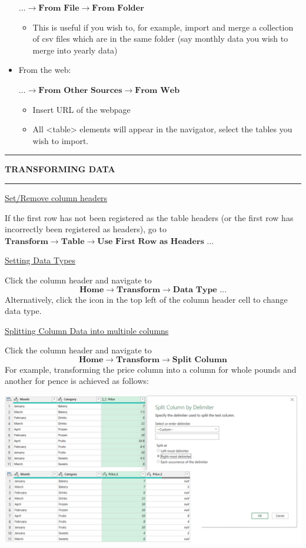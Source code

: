 \documentclass[8pt]{extarticle}
\newcommand{\heading}[1]{%
    \noindent
    \rule{\linewidth}{0.4pt}
    \begin{center}
        \vspace{-1ex}
        \textbf{#1}        
        \vspace{-2.5ex}
    \end{center}
    \rule{\linewidth}{0.4pt}
}
\begin{document}
\begin{multicols}{3}
\begin{itemize}
    $\dots \rightarrow \textbf{From File} \rightarrow \textbf{From Folder}$
    \begin{itemize}
        \item This is useful if you wish to, for example, import and merge a collection of csv files which are in the same folder (say monthly data you wish to merge into yearly data)
    \end{itemize}
    \item From the web:

    $\dots \rightarrow \textbf{From Other Sources} \rightarrow \textbf{From Web}$
    \begin{itemize}
        \item Insert URL of the webpage
        \item All <table> elements will appear in the navigator, select the tables you wish to import.
    \end{itemize}
\end{itemize}

\heading{TRANSFORMING DATA}

\begin{center}
    \underline{Set/Remove column headers}
\end{center}

If the first row has not been registered as the table headers (or the first row has incorrectly been registered as headers), go to $\textbf{Transform} \rightarrow \textbf{Table} \rightarrow \textbf{Use First Row as Headers ...}$

\begin{center}
    \underline{Setting Data Types}
\end{center}

Click the column header and navigate to 
\[\textbf{Home} \rightarrow \textbf{Transform} \rightarrow \textbf{Data Type ...}\]
Alternatively, click the icon in the top left of the column header cell to change data type. 

\begin{center}
    \underline{Splitting Column Data into multiple columns}
\end{center}

Click the column header and navigate to 
\[\textbf{Home} \rightarrow \textbf{Transform} \rightarrow \textbf{Split Column}\]
For example, transforming the price column into a column for whole pounds and another for pence is achieved as follows:
\begin{center}
    \includegraphics[width=\columnwidth]{images/split_column.png}
\end{center}


\end{multicols}
\end{document}
